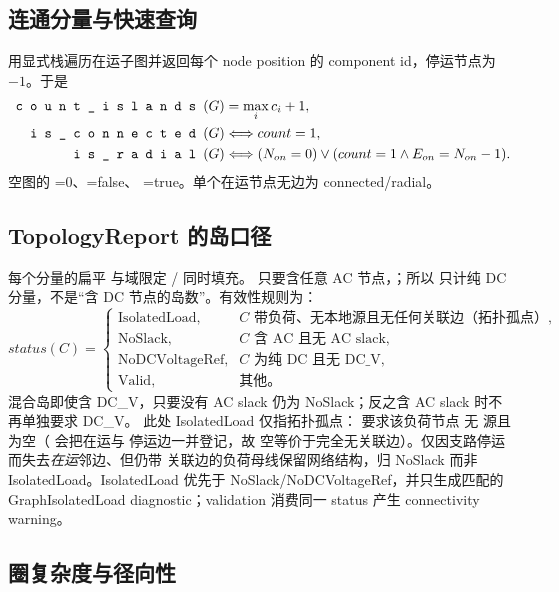 \subsection{连通分量与快速查询}

 用显式栈遍历在运子图并返回每个 node position 的
component id，停运节点为 $-1$。于是
\begin{align}
\srcpath{count\_islands}(G)&=\max_i c_i+1,\\
\srcpath{is\_connected}(G)&\Longleftrightarrow count=1,\\
\srcpath{is\_radial}(G)&\Longleftrightarrow
  (N_{on}=0)\lor(count=1\land E_{on}=N_{on}-1).
\end{align}
空图的 =0、=false、
=true。单个在运节点无边为 connected/radial。

\subsection{TopologyReport 的岛口径}

每个分量的扁平  与域限定 / 同时填充。
只要含任意 AC 节点，；所以  只计纯 DC 分量，不是“含 DC
节点的岛数”。有效性规则为：
\begin{equation}
status(C)=\begin{cases}
\text{IsolatedLoad},&C\text{ 带负荷、无本地源且无任何关联边（拓扑孤点）},\\
\text{NoSlack},&C\text{ 含 AC 且无 AC slack},\\
\text{NoDCVoltageRef},&C\text{ 为纯 DC 且无 DC\_V},\\
\text{Valid},&\text{其他。}
\end{cases}
\end{equation}
混合岛即使含 DC\_V，只要没有 AC slack 仍为 NoSlack；反之含 AC slack 时不再单独要求 DC\_V。
此处 IsolatedLoad 仅指拓扑孤点： 要求该负荷节点
无  源且  为空（ 会把在运与
停运边一并登记，故  空等价于完全无关联边）。仅因支路停运而失去\emph{在运}邻边、但仍带
关联边的负荷母线保留网络结构，归 NoSlack 而非 IsolatedLoad。IsolatedLoad 优先于
NoSlack/NoDCVoltageRef，并只生成匹配的 GraphIsolatedLoad diagnostic；validation 消费同一 status
产生 connectivity warning。

\subsection{圈复杂度与径向性}

